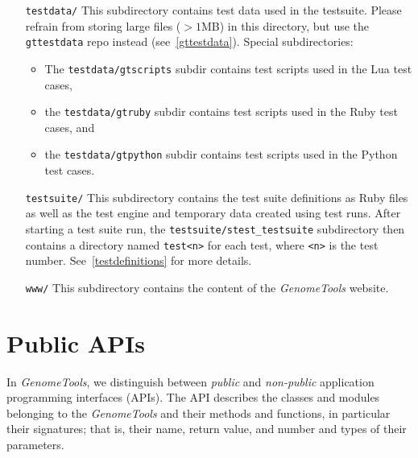 \documentclass[11pt,final]{article}
\newcommand{\keyword}[1]{\lstinline{#1}}
\newcommand{\Gt}[0]{\emph{GenomeTools}\xspace}
\begin{document}
\begin{itemize}
\begin{itemize}
             annotation code,
       \item the \texttt{src/match} subdir with code for index structure
             construction and access, short read mapping, matching algorithms
             etc.,
       \item the \texttt{src/mgth} subdir contains \emph{MetaGenomeThreader}
             code,
       \item the \texttt{src/patches} subdirectory with platform-specific
             patches, and
       \item the \texttt{tools} subdir with code for all the tools included with
             \Gt .
     \end{itemize}
\item[\texttt{testdata/}]
     This subdirectory contains test data used in the testsuite. Please refrain
     from storing large files ($>1$MB) in this directory, but use the
     \keyword{gttestdata} repo instead (see~\ref{gttestdata}). Special
     subdirectories:
     \begin{itemize}
       \item The \texttt{testdata/gtscripts} subdir contains test scripts used
       in the Lua test cases,
       \item the \texttt{testdata/gtruby} subdir contains test scripts used
       in the Ruby test cases, and
       \item the \texttt{testdata/gtpython} subdir contains test scripts used
       in the Python test cases.
     \end{itemize}
\item[\texttt{testsuite/}]
     This subdirectory contains the test suite definitions as Ruby files as
     well as the test engine and temporary data created using test runs.
     After starting a test suite run, the \keyword{testsuite/stest_testsuite}
     subdirectory then contains a directory named \keyword{test<n>} for each
     test, where \keyword{<n>} is the test number. See~\ref{testdefinitions}
     for more details.
\item[\texttt{www/}]
     This subdirectory contains the content of the \Gt website.
\end{itemize}


\section{Public APIs}

In \Gt , we distinguish between \emph{public} and \emph{non-public} application
programming interfaces (APIs). The API describes the classes and modules
belonging to the \Gt and their methods and functions, in particular their
signatures; that is, their name, return value, and number and types of their
parameters.
\end{document}

